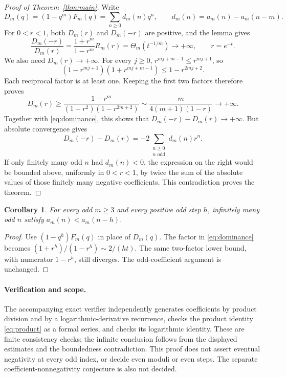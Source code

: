 \documentclass[11pt]{article}
\newtheorem{corollary}{Corollary}
\begin{document}
\begin{proof}[Proof of Theorem~\ref{thm:main}]
Write
\[
 D_m(q)=(1-q^m)F_m(q)=\sum_{n\ge0}d_m(n)q^n,
 \qquad d_m(n)=a_m(n)-a_m(n-m).
\]
For $0<r<1$, both $D_m(r)$ and $D_m(-r)$ are positive, and the lemma gives
\begin{equation}\label{eq:dominance}
 \frac{D_m(-r)}{D_m(r)}
 =\frac{1+r^m}{1-r^m}R_m(r)
 =\Theta_m(t^{-1/m})\longrightarrow+\infty,
 \qquad r=e^{-t}.
\end{equation}
We also need $D_m(r)\to+\infty$. For every $j\ge0$,
$r^{mj+m-1}\le r^{mj+1}$, so
\[
 (1-r^{mj+1})(1+r^{mj+m-1})\le1-r^{2mj+2}.
\]
Each reciprocal factor is at least one. Keeping the first two
factors therefore proves
\[
 D_m(r)\ge
 \frac{1-r^m}{(1-r^2)(1-r^{2m+2})}
 \sim \frac{m}{4(m+1)(1-r)}\longrightarrow+\infty.
\]
Together with \eqref{eq:dominance}, this shows that
$D_m(-r)-D_m(r)\to+\infty$. But absolute convergence gives
\[
 D_m(-r)-D_m(r)
                =-2\sum_{\substack{n\ge0\\n\text{ odd}}}d_m(n)r^n.
\]
If only finitely many odd $n$ had $d_m(n)<0$, the expression on the
right would be bounded above, uniformly in $0<r<1$, by twice the
sum of the absolute values of those finitely many negative coefficients.
This contradiction proves the theorem.
\end{proof}

\begin{corollary}
For every odd $m\ge3$ and every positive odd step $h$, infinitely
many odd $n$ satisfy $a_m(n)<a_m(n-h)$.
\end{corollary}
\begin{proof}
Use $(1-q^h)F_m(q)$ in place of $D_m(q)$. The factor in
\eqref{eq:dominance} becomes $(1+r^h)/(1-r^h)\sim2/(ht)$.
The same two-factor lower bound, with numerator $1-r^h$, still
diverges. The odd-coefficient argument is unchanged.
\end{proof}

\paragraph{Verification and scope.}
The accompanying exact verifier independently generates coefficients
by product division and by a logarithmic-derivative recurrence,
checks the product identity \eqref{eq:product} as a formal series,
and checks its logarithmic identity. These are finite consistency
checks; the infinite conclusion follows from the displayed estimates
and the boundedness contradiction. This proof does not assert eventual
negativity at every odd index, or decide even moduli or even steps.
The separate coefficient-nonnegativity conjecture is also not decided.
\end{document}
